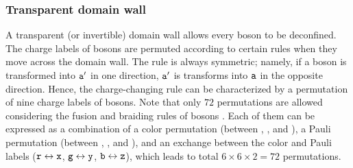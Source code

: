 \documentclass[
 prx,
 reprint,
 superscriptaddress,
 longbibliography,
 dvipsnames
]{revtex4-2}
\begin{document}
\subsubsection{Transparent domain wall}
A transparent (or invertible) domain wall \cite{kitaev2012models} allows every boson to be deconfined.
The charge labels of bosons are permuted according to certain rules when they move across the domain wall.
The rule is always symmetric; namely, if a boson  is transformed into $\texttt{a}'$ in one direction, $\texttt{a}'$ is transforms into $\texttt{a}$ in the opposite direction.
Hence, the charge-changing rule can be characterized by a permutation of nine charge labels of bosons.
Note that only $72$ permutations are allowed considering the fusion and braiding rules of bosons \cite{kesselring2018boundaries}.
Each of them can be expressed as a combination of a color permutation (between \rbs, \gbs, and \bbs), a Pauli permutation (between \xbs, \ybs, and \zbs), and an exchange between the color and Pauli labels ($\texttt{r} \leftrightarrow \texttt{x}$, $\texttt{g} \leftrightarrow \texttt{y}$, $\texttt{b} \leftrightarrow \texttt{z}$), which leads to total $6 \times 6 \times 2 = 72$ permutations.

\end{document}
